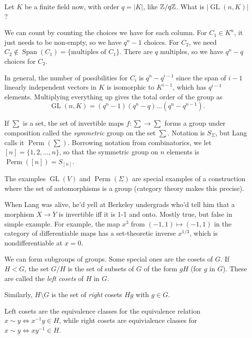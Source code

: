\documentclass[11 pt]{scrartcl}
\DeclareMathOperator{\GL}{GL}
\DeclareMathOperator{\Span}{Span}
\DeclareMathOperator{\Perm}{Perm}
\begin{document}
Let $K$ be a finite field now, with order $q = |K|$, like $\mathbb Z/q\mathbb Z$. What is $|\GL(n, K)|$? 

We can count by counting the choices we have for each column. For $C_1 \in K^n$, it just needs to be non-empty, so we have $q^n - 1$ choices. For $C_2$, we need $C_2 \not\in \Span(C_1) = \{\text{multiples of }C_1\}$. There are $q$ multiples, so we have $q^n - q$ choices for $C_2$. 

In general, the number of possibilities for $C_i$ is $q^n - q^{i-1}$ since the span of $i-1$ linearly independent vectors in $K$ is isomorphic to $K^{i-1}$, which has $q^{i-1}$ elements. Multiplying everything up gives the total order of the group as 
    \[ \GL(n, K) = (q^n-1)(q^n-q)\dots (q^n - q^{n-1}).\]

If $\sum$ is a set, the set of invertible maps $f:\sum\to \sum$ forms a group under composition called the \emph{symmetric} group on the set $\sum$. Notation is $S_\Sigma$, but Lang calls it $\Perm(\sum)$. Borrowing notation from combinatorics, we let $[n] = \{1, 2, \dots, n\}$, so that the symmetric group on $n$ elements is $\Perm([n]) = S_{[n]}$. 

\begin{remark}
    The examples $\GL(V)$ and $\Perm(\Sigma)$ are special examples of a construction where the set of automorphisms is a group (category theory makes this precise).
\end{remark}

\begin{remark}
    When Lang was alive, he'd yell at Berkeley undergrads who'd tell him that a morphism $X\to Y$ is invertible iff it is 1-1 and onto. Mostly true, but false in simple example. For example, the map $x^3$ from $(-1, 1)\mapsto (-1, 1)$ in the category of differentiable maps has a set-theoretic inverse $x^{1/3}$, which is nondifferentiable at $x = 0$. 
\end{remark}

We can form subgroups of groups. Some special ones are the cosets of $G$. If $H < G$, the set $G/H$ is the set of subsets of $G$ of the form $gH$ (for $g$ in $G$). These are called the \emph{left cosets} of $H$ in $G$. 

Similarly, $H\setminus G$ is the set of \emph{right} cosets $Hg$ with $g\in G$. 

Left cosets are the equivalence classes for the equivalence relation $x\sim y \iff x^{-1}y \in H$, while right cosets are equivialence classes for $x\sim y \iff xy^{-1} \in H$.
\end{document}
